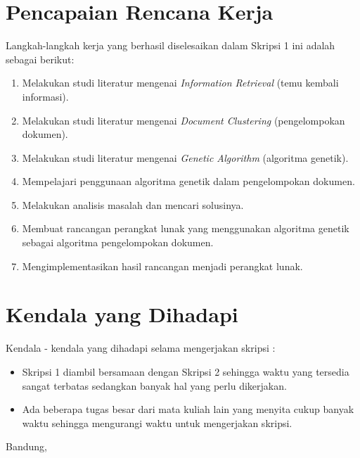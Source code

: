 \documentclass[a4paper,twoside]{article}
\begin{document}
\section{Pencapaian Rencana Kerja}
Langkah-langkah kerja yang berhasil diselesaikan dalam Skripsi 1 ini adalah sebagai berikut:
\begin{enumerate}
	\item Melakukan studi literatur mengenai {\it Information Retrieval} (temu kembali informasi).
	\item Melakukan studi literatur mengenai {\it Document Clustering} (pengelompokan dokumen).
    \item Melakukan studi literatur mengenai {\it Genetic Algorithm} (algoritma genetik).
    \item Mempelajari penggunaan algoritma genetik dalam pengelompokan dokumen.
    \item Melakukan analisis masalah dan mencari solusinya.
    \item Membuat rancangan perangkat lunak yang menggunakan algoritma genetik sebagai algoritma pengelompokan dokumen.
    \item Mengimplementasikan hasil rancangan menjadi perangkat lunak.
\end{enumerate}


\section{Kendala yang Dihadapi}
Kendala - kendala yang dihadapi selama mengerjakan skripsi :
\begin{itemize}
	\item Skripsi 1 diambil bersamaan dengan Skripsi 2 sehingga waktu yang tersedia sangat terbatas sedangkan banyak hal yang perlu dikerjakan.
	\item Ada beberapa tugas besar dari mata kuliah lain yang menyita cukup banyak waktu sehingga mengurangi waktu untuk mengerjakan skripsi.
\end{itemize}

\vspace{1cm}
\centering Bandung, \tanggal\\
\vspace{2cm} \nama \\ 
\vspace{1cm}
\end{document}
